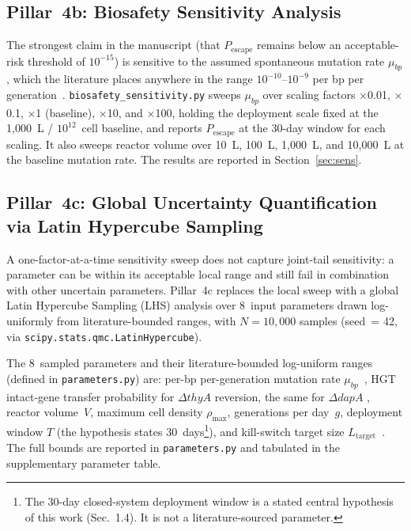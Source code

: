 \documentclass[10pt,twocolumn,letterpaper,
              colorlinks=true,
              linkcolor=blue!70!black,
              citecolor=blue!70!black,
              urlcolor=blue!70!black,
              pdfborder={0 0 0}]{article}
\begin{document}
\subsection{Pillar~4b: Biosafety Sensitivity Analysis}

The strongest claim in the manuscript (that $P_{\text{escape}}$ remains
below an acceptable-risk threshold of $10^{-15}$) is sensitive to the
assumed spontaneous mutation rate $\mu_{bp}$, which the literature places
anywhere in the range $10^{-10}$--$10^{-9}$ per bp per
generation~\cite{drake1991,lee2012}. \texttt{biosafety\_sensitivity.py}
sweeps $\mu_{bp}$ over scaling factors $\times$0.01, $\times$0.1,
$\times$1 (baseline), $\times$10, and $\times$100, holding the
deployment scale fixed at the 1{,}000~L / $10^{12}$~cell baseline, and
reports $P_{\text{escape}}$ at the 30-day window for each scaling. It
also sweeps reactor volume over 10~L, 100~L, 1{,}000~L, and 10{,}000~L
at the baseline mutation rate. The results are reported in
Section~\ref{sec:sens}.

\subsection{Pillar~4c: Global Uncertainty Quantification via
            Latin Hypercube Sampling}
\label{sec:pillar4c}

A one-factor-at-a-time sensitivity sweep does not capture joint-tail
sensitivity: a parameter can be within its acceptable local range and
still fail in combination with other uncertain parameters. Pillar~4c
replaces the local sweep with a global Latin Hypercube Sampling (LHS)
analysis over 8~input parameters drawn log-uniformly from
literature-bounded ranges, with $N = 10{,}000$ samples (seed~= 42, via
\texttt{scipy.stats.qmc.LatinHypercube}).

The 8~sampled parameters and their literature-bounded log-uniform ranges
(defined in \texttt{parameters.py}) are: per-bp per-generation mutation
rate $\mu_{bp}$~\cite{drake1991,lee2012}, HGT intact-gene transfer
probability for $\Delta thyA$ reversion, the same for $\Delta dapA$
\cite{dahlberg1998,muela1994,licht1999}, reactor volume~$V$, maximum
cell density $\rho_{\max}$, generations per day~$g$, deployment window
$T$ (the hypothesis states 30~days\footnote{The 30-day closed-system deployment window is a stated central hypothesis of this work (Sec.~1.4). It is not a literature-sourced parameter.}), and kill-switch
target size $L_{\text{target}}$~\cite{chan2016}. The full bounds are
reported in \texttt{parameters.py} and tabulated in the supplementary
parameter table.
\end{document}
